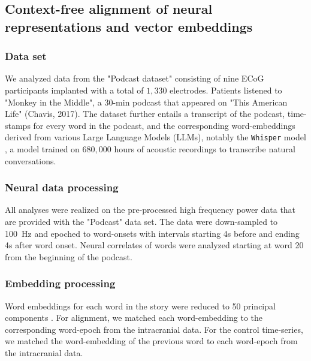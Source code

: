 \documentclass{article}
\begin{document}
\subsection*{Context-free alignment of neural representations and vector embeddings}
\subsubsection*{Data set} We analyzed data from the "Podcast dataset" \cite{zadaPodcastECoGDataset2025a} consisting of nine ECoG participants implanted with a total of $1,330$ electrodes. Patients listened to  "Monkey in the Middle", a 30-min podcast that appeared on "This American Life" (Chavis, 2017). The dataset further entails a transcript of the podcast, time-stamps for every word in the podcast, and the corresponding word-embeddings derived from various Large Language Models (LLMs), notably the \texttt{Whisper} model \cite{radfordRobustSpeechRecognition2022}, a model trained on $680,000$ hours of acoustic recordings to transcribe natural conversations.

\subsubsection*{Neural data processing} All analyses were realized on the pre-processed high frequency power data that are provided with the "Podcast" data set.
The data were down-sampled to 100~Hz and epoched to word-onsets with intervals starting 4s before and ending 4s after word onset. Neural correlates of words were analyzed starting at word 20 from the beginning of the podcast.
\subsubsection*{Embedding processing} Word embeddings for each word in the story were reduced to 50 principal components \cite{goldsteinSharedComputationalPrinciples2022}. For alignment, we matched each word-embedding to the corresponding word-epoch from the intracranial data. For the control time-series, we matched the word-embedding of the previous word to each word-epoch from the intracranial data.
\end{document}
